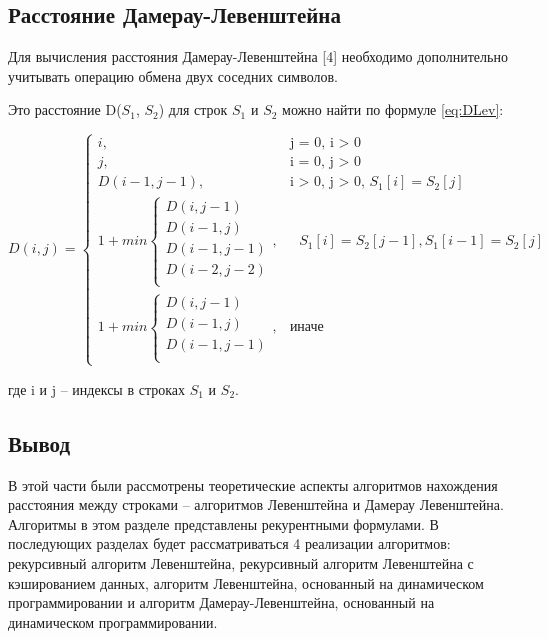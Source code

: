 \documentclass{article}
\begin{document}
\subsection{Расстояние Дамерау-Левенштейна}
Для вычисления расстояния Дамерау-Левенштейна [4] необходимо дополнительно учитывать операцию обмена
двух соседних символов.

Это расстояние D($S_{1}$, $S_{2}$) для строк $S_{1}$ и $S_{2}$ можно найти  по формуле \ref{eq:DLev}:

\begin{equation}
	\label{eq:DLev}
	D(i, j) = \begin{cases}
	i, &\text{j = 0, i > 0} \\
	j, &\text{i = 0, j > 0} \\
	D(i - 1, j - 1), &\text{i > 0, j > 0, $S_{1}[i] = S_{2}[j]$} \\
	1 + min \begin{cases}
		D(i, j - 1)\\
		D(i - 1, j)\\
		D(i - 1, j - 1) \\
		D(i - 2, j - 2) \\
	\end{cases}, &\text{ $S_{1}[i] = S_{2}[j - 1],  S_{1}[i - 1] = S_{2}[j]$}\\
	1 + min \begin{cases}
		D(i, j - 1)\\
		D(i - 1, j)\\
		D(i - 1, j - 1)\\
	\end{cases}, &\text{иначе}
	\end{cases}
\end{equation}

где i и j -- индексы в строках $S_{1}$ и $S_{2}$.

\subsection{Вывод}
В этой части были рассмотрены теоретические аспекты алгоритмов нахождения расстояния между строками -- 
алгоритмов Левенштейна и Дамерау Левенштейна. Алгоритмы в этом разделе представлены рекурентными
формулами. В последующих разделах будет рассматриваться 4 реализации алгоритмов: рекурсивный алгоритм 
Левенштейна, рекурсивный алгоритм Левенштейна с кэшированием данных, алгоритм Левенштейна, основанный 
на динамическом программировании и алгоритм Дамерау-Левенштейна, основанный на динамическом 
программировании.
\end{document}
